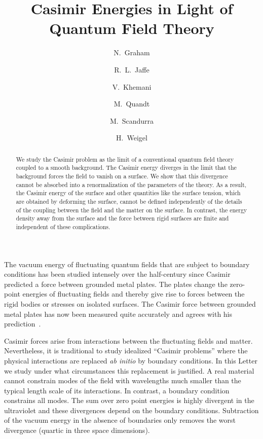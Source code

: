 \documentclass[a4paper,aps,amsfonts,prl,showpacs,nobibnotes,nofootinbib,%
tightenlines,twocolumn]{revtex4}
\begin{document}
\title{Casimir Energies in Light of Quantum Field Theory}

\author{N.~Graham}

\author{R.~L.~Jaffe}
\author{V.~Khemani}
\author{M.~Quandt}
\author{M.~Scandurra}

\author{H.~Weigel}

\begin{abstract}\noindent We study the Casimir problem as the limit of
a conventional quantum field theory coupled to a smooth background. 
The Casimir energy diverges in the limit that the background forces
the field to vanish on a surface.  We show that this divergence cannot
be absorbed into a renormalization of the parameters of the theory. 
As a result, the Casimir energy of the surface and other quantities
like the surface tension, which are obtained by deforming the surface,
cannot be defined independently of the details of the coupling between
the field and the matter on the surface.  In contrast, the energy
density away from the surface and the force between rigid surfaces are
finite and independent of these complications.
\end{abstract}
\vspace*{-\bigskipamount}

\maketitle


The vacuum energy of fluctuating quantum fields that are subject to
boundary conditions has been studied intensely over the half-century
since Casimir predicted a force between grounded metal
plates\cite{casimir,MT,bmm}.  The plates change the zero-point energies
of fluctuating fields and thereby give rise to forces between the
rigid bodies or stresses on isolated surfaces.  The Casimir force
between grounded metal plates has now been measured quite accurately
and agrees with his prediction~\cite{expt1,expt2,expt3}.

Casimir forces arise from interactions between the fluctuating fields
and matter.  Nevertheless, it is traditional to study idealized
``Casimir problems'' where the physical interactions are replaced {\it
ab initio} by boundary conditions.  In this Letter we study under what
circumstances this replacement is justified.  A real material cannot
constrain modes of the field with wavelengths much smaller than the
typical length scale of its interactions.  In contrast, a boundary
condition constrains all modes.  The sum over zero point energies is
highly divergent in the ultraviolet and these divergences depend on
the boundary conditions.  Subtraction of the vacuum energy in the
absence of boundaries only removes the worst divergence (quartic in
three space dimensions).   
\end{document}

